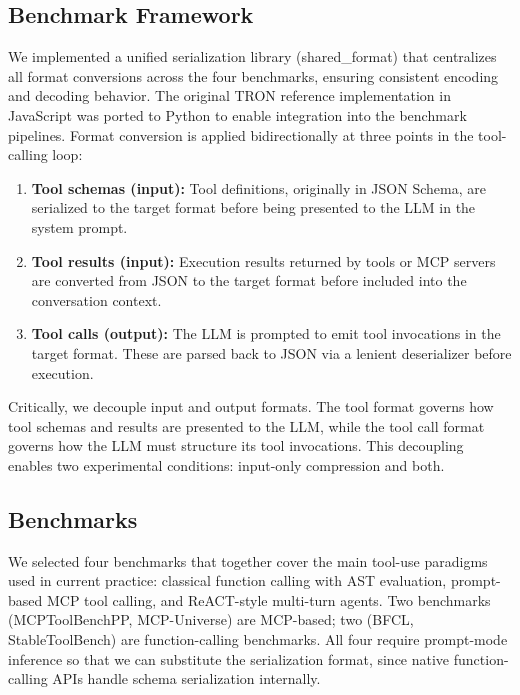 \documentclass[11pt]{article}
\begin{document}
\subsection{Benchmark Framework}
\label{sec:framework}

We implemented a unified serialization library (shared\_format) that centralizes all format conversions across the four benchmarks, ensuring consistent encoding and decoding behavior. The original TRON reference implementation in JavaScript \cite{tron-format/tron-javascript_2026} was ported to Python to enable integration into the benchmark pipelines. Format conversion is applied bidirectionally at three points in the tool-calling loop:

\begin{enumerate}
    \item \textbf{Tool schemas (input):} Tool definitions, originally in JSON Schema, are serialized to the target format before being presented to the LLM in the system prompt.
    \item \textbf{Tool results (input):} Execution results returned by tools or MCP servers are converted from JSON to the target format before included into the conversation context.
    \item \textbf{Tool calls (output):} The LLM is prompted to emit tool invocations in the target format. These are parsed back to JSON via a lenient deserializer before execution.
\end{enumerate}

Critically, we decouple input and output formats. The tool format governs how tool schemas and results are presented to the LLM, while the tool call format governs how the LLM must structure its tool invocations. This decoupling enables two experimental conditions: input-only compression and both.

\subsection{Benchmarks}
\label{sec:benchmarks}

We selected four benchmarks that together cover the main tool-use paradigms used in current practice: classical function calling with AST evaluation, prompt-based MCP tool calling, and ReACT-style multi-turn agents. Two benchmarks (MCPToolBenchPP, MCP-Universe) are MCP-based; two (BFCL, StableToolBench) are function-calling benchmarks. All four require prompt-mode inference so that we can substitute the serialization format, since native function-calling APIs handle schema serialization internally.
\end{document}
